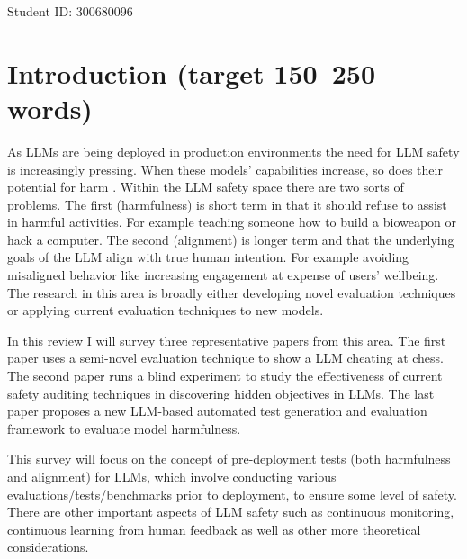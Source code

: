 \documentclass{article}[11pt]
\begin{document}
\noindent Student ID: 300680096 \\

\section*{Introduction (target 150--250 words)}
\begin{mdframed}[] %
As LLMs are being deployed in production environments the need for LLM safety is increasingly pressing. When these models' capabilities increase, so does their potential for harm \cite{shevlaneModelEvaluationExtreme2023,kangExploitingProgrammaticBehavior2023}. Within the LLM safety space there are two sorts of problems. The first (harmfulness) is short term in that it should refuse to assist in harmful activities. For example teaching someone how to build a bioweapon or hack a computer. The second (alignment) is longer term and that the underlying goals of the LLM align with true human intention.  For example avoiding misaligned behavior like increasing engagement at expense of users' wellbeing. The research in this area is broadly either developing novel evaluation techniques or applying current evaluation techniques to new models.

In this review I will survey three representative papers from this area. The first paper \cite{bondarenkoDemonstratingSpecificationGaming2025} uses a semi-novel evaluation technique to show a LLM cheating at chess. The second paper \cite{marksAuditingLanguageModels2025} runs a blind experiment to study the effectiveness of current safety auditing techniques in discovering hidden objectives in LLMs. The last paper \cite{yuanSEvalAutomatedComprehensive2025} proposes a new LLM-based automated test generation and evaluation framework to evaluate model harmfulness.

This survey will focus on the concept of pre-deployment tests (both harmfulness and alignment) for LLMs, which involve conducting various evaluations/tests/benchmarks prior to deployment, to ensure some level of safety. There are other important aspects of LLM safety such as continuous monitoring, continuous learning from human feedback as well as other more theoretical considerations.

\end{mdframed}
\end{document}
